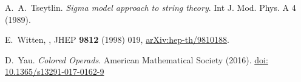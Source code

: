 \documentclass{article}
\numberwithin{tm}{section}
\numberwithin{dn}{section}
\numberwithin{as}{section}
\numberwithin{rk}{section}
\numberwithin{lem}{section}
\numberwithin{ax}{section}
\numberwithin{pp}{section}
\numberwithin{eg}{section}
\numberwithin{war}{section}
\numberwithin{equation}{section}
\numberwithin{prop}{section}
\numberwithin{nt}{section}
\numberwithin{rc}{section}
\numberwithin{setup}{section}
\begin{document}
\begin{thebibliography}{9}
		 A.~A.~Tseytlin. \emph{Sigma model approach to string theory}. Int J. Mod. Phys. A 4 (1989).
		
		E.~Witten,
		,
		\newblock JHEP {\bf 9812} (1998) 019,
		\newblock \href{https://arxiv.org/abs/hep-th/9810188}{arXiv:hep-th/9810188}.
		
		 D.~Yau. \emph{Colored Operads}. American Mathematical Society (2016). \href{https://link.springer.com/article/10.1365/s13291-017-0162-9}{doi: 10.1365/s13291-017-0162-9}
		
	\end{thebibliography}
	
\end{document}

